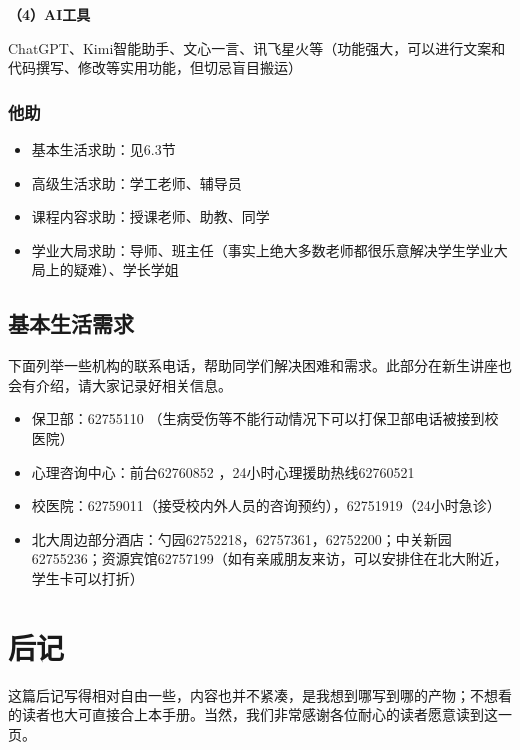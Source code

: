 \documentclass[11pt,oneside]{book}
\begin{document}
\textbf{（4）AI工具}

ChatGPT、Kimi智能助手、文心一言、讯飞星火等（功能强大，可以进行文案和代码撰写、修改等实用功能，但切忌盲目搬运）

\subsection{他助}
\begin{itemize}
    \item 基本生活求助：见6.3节

    \item 高级生活求助：学工老师、辅导员

    \item 课程内容求助：授课老师、助教、同学

    \item 学业大局求助：导师、班主任（事实上绝大多数老师都很乐意解决学生学业大局上的疑难）、学长学姐

\end{itemize}


\section{基本生活需求}
下面列举一些机构的联系电话，帮助同学们解决困难和需求。此部分在新生讲座也会有介绍，请大家记录好相关信息。
\begin{itemize}
    \item 保卫部：62755110 （生病受伤等不能行动情况下可以打保卫部电话被接到校医院）

    \item 心理咨询中心：前台62760852 ，24小时心理援助热线62760521

    \item 校医院：62759011（接受校内外人员的咨询预约），62751919（24小时急诊）

    \item 北大周边部分酒店：勺园62752218，62757361，62752200；中关新园62755236；资源宾馆62757199（如有亲戚朋友来访，可以安排住在北大附近，学生卡可以打折）

\end{itemize}

\backmatter

\chapter*{后记}
这篇后记写得相对自由一些，内容也并不紧凑，是我想到哪写到哪的产物；不想看的读者也大可直接合上本手册。当然，我们非常感谢各位耐心的读者愿意读到这一页。
\end{document}
